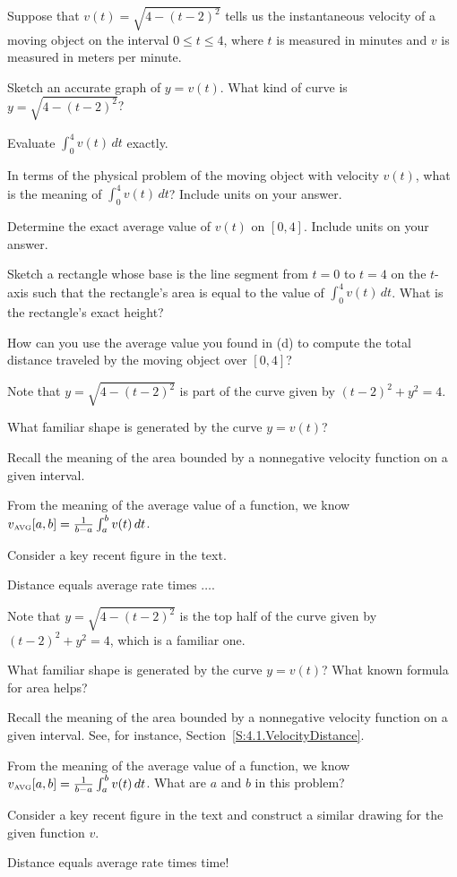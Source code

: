 \begin{activity} \label{A:4.3.3}  Suppose that $v(t) = \sqrt{4-(t-2)^2}$ tells us the instantaneous velocity of a moving object on the interval $0 \le t \le 4$, where $t$ is measured in minutes and $v$ is measured in meters per minute.
\ba
	\item Sketch an accurate graph of $y = v(t)$.  What kind of curve is $y = \sqrt{4-(t-2)^2}$?
	\item Evaluate $\int_0^4 v(t) \, dt$ exactly.
	\item In terms of the physical problem of the moving object with velocity $v(t)$, what is the meaning of $\int_0^4 v(t) \, dt$?  Include units on your answer.
	\item Determine the exact average value of $v(t)$ on $[0,4]$.  Include units on your answer.
	\item Sketch a rectangle whose base is the line segment from $t=0$ to $t = 4$ on the $t$-axis such that the rectangle's area is equal to the value of $\int_0^4 v(t) \, dt$.  What is the rectangle's exact height?
	\item How can you use the average value you found in (d) to compute the total distance traveled by the moving object over $[0,4]$?
\ea
\end{activity}
\begin{smallhint}
\ba
	\item Note that $y = \sqrt{4-(t-2)^2}$ is part of the curve given by $(t-2)^2 + y^2 = 4$.
	\item What familiar shape is generated by the curve $y = v(t)$?
	\item Recall the meaning of the area bounded by a nonnegative velocity function on a given interval.
	\item From the meaning of the average value of a function, we know $v_{\mbox{\tiny{AVG}}}[a,b] = \frac{1}{b-a}  \int_a^b v(t) \, dt$.
	\item Consider a key recent figure in the text.
	\item Distance equals average rate times $\ldots$.
\ea
\end{smallhint}
\begin{bighint}
\ba
	\item Note that $y = \sqrt{4-(t-2)^2}$ is the top half of the curve given by $(t-2)^2 + y^2 = 4$, which is a familiar one.
	\item What familiar shape is generated by the curve $y = v(t)$?  What known formula for area helps?
	\item Recall the meaning of the area bounded by a nonnegative velocity function on a given interval.  See, for instance, Section~\ref{S:4.1.VelocityDistance}.
	\item From the meaning of the average value of a function, we know $v_{\mbox{\tiny{AVG}}}[a,b] = \frac{1}{b-a}  \int_a^b v(t) \, dt$.  What are $a$ and $b$ in this problem?
	\item Consider a key recent figure in the text and construct a similar drawing for the given function $v$.
	\item Distance equals average rate times time!
\ea
\end{bighint}

